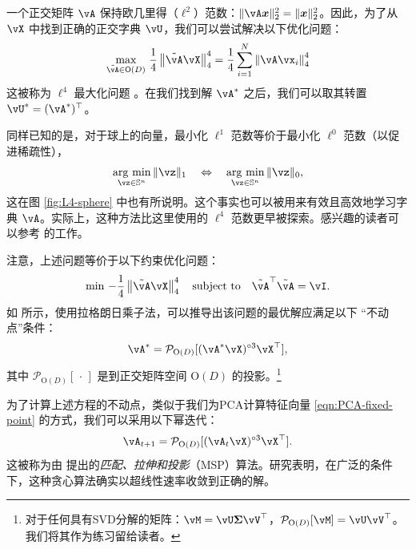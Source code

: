 \documentclass[../../book-main.tex]{subfiles}
\begin{document}
一个正交矩阵 $\vA$ 保持欧几里得（\(\ell^{2}\)）范数：$\|\vA \x\|_2^2 = \|\x\|_2^2$。因此，为了从 $\vX$ 中找到正确的正交字典 $\vU$，我们可以尝试解决以下优化问题：
\begin{equation}\label{eq0:orthogonal-dictionary-learning-l4}
    \max_{\tilde{\vA} \in \O(D)}\,
     \frac{1}{4} \norm*{
    \tilde{\vA} \vX
    }_4^4 =  \frac{1}{4} \sum_{i=1}^N \norm*{
    \vA \vx_i
    }_4^4
\end{equation}
这被称为 $\ell^4$ 最大化问题 \cite{Zhai-2020}。在我们找到解 \(\vA^{\ast}\) 之后，我们可以取其转置 \(\vU^{\ast} = (\vA^{\ast})^{\top}\)。
\begin{remark}
    同样已知的是，对于球上的向量，最小化 $\ell^1$ 范数等价于最小化 $\ell^0$ 范数（以促进稀疏性），
\begin{equation*}
            \argmin_{\vz \in \mathbb{S}^n}\|\vz\|_{1}\quad\Leftrightarrow\quad \argmin_{\vz \in \mathbb{S}^n}\|\vz\|_{0},
\end{equation*}
这在图 \ref{fig:L4-sphere} 中也有所说明。这个事实也可以被用来有效且高效地学习字典 $\vA$。实际上，这种方法比这里使用的 $\ell^4$ 范数更早被探索。感兴趣的读者可以参考 \cite{qu2020findingsparsestvectorssubspace} 的工作。
\end{remark}

注意，上述问题等价于以下约束优化问题：
\begin{equation}\label{eq:orthogonal-dictionary-learning-l4}
    \min\,
    -   \frac{1}{4} \norm*{
    \tilde{\vA} \vX
    }_4^4 \quad \mbox{subject to} \quad  \tilde{\vA}^\top\tilde{\vA} = \vI.
\end{equation}
如 \cite{Wright-Ma-2022} 所示，使用拉格朗日乘子法，可以推导出该问题的最优解应满足以下
“不动点”条件：
\begin{equation}
    \vA^{\ast} = \mathcal{P}_{\mathrm O(D)}[( {\vA^{\ast} \vX})^{\circ3}\vX^\top],
\end{equation}
其中 $\mathcal{P}_{\mathrm O(D)}[\,\cdot\,]$ 是到正交矩阵空间 $\mathrm O(D)$ 的投影。\footnote{对于任何具有SVD分解的矩阵：$\vM = \vU\bm \Sigma \vV^\top$，$\mathcal{P}_{\mathrm O(D)}[\vM] = \vU \vV^\top$。我们将其作为练习留给读者。}

为了计算上述方程的不动点，类似于我们为PCA计算特征向量 \eqref{eqn:PCA-fixed-point} 的方式，我们可以采用以下幂迭代：
\begin{equation}\label{eq:msp_iteration}
    \vA_{t+1} = \mathcal{P}_{\mathrm O(D)}[( {\vA_t \vX})^{\circ3}\vX^\top].
\end{equation}
这被称为由 \cite{Zhai-2020} 提出的\textit{匹配、拉伸和投影}（MSP）算法。研究表明，在广泛的条件下，这种贪心算法确实以超线性速率收敛到正确的解。
\end{document}
